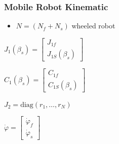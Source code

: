 \subsubsection{Mobile Robot Kinematic}
\begin{itemize}
    \item $N = (N_f + N_s)$ wheeled robot
\end{itemize}
\begin{itemize*}
    \item $J_1(\beta_s) =
        \begin{bmatrix}
            J_{1f}\\
            J_{1S}(\beta_s)
        \end{bmatrix}$
    \item $C_1(\beta_s) =
        \begin{bmatrix}
            C_{1f}\\
            C_{1S}(\beta_s)
        \end{bmatrix}$
    \item $J_2 = \mathrm{diag}(r_1, \dots, r_N)$
    \item $\dot \varphi =
        \begin{bmatrix}
            \dot \varphi_f\\
            \dot \varphi_s
        \end{bmatrix}$
\end{itemize*}
